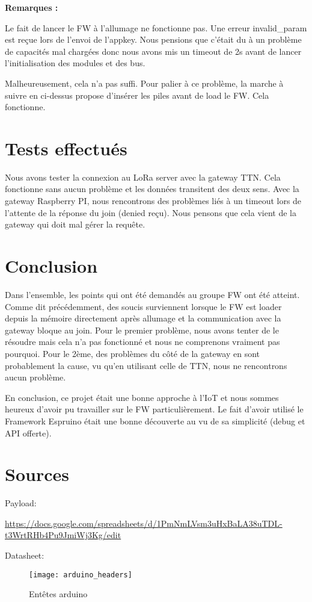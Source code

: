 \textbf{Remarques :}

Le fait de lancer le FW à l'allumage ne fonctionne pas. Une erreur invalid\_param est reçue lors de l'envoi de l'appkey. Nous pensions que c'était du à un problème de capacités mal chargées donc nous avons mis un timeout de 2s avant de lancer l'initialisation des modules et des bus.

Malheureusement, cela n'a pas suffi. Pour palier à ce problème, la marche à suivre en ci-dessus propose d'insérer les piles avant de load le FW. Cela fonctionne.

\section{Tests effectués}

Nous avons tester la connexion au LoRa server avec la gateway TTN. Cela fonctionne sans aucun problème et les données transitent des deux sens.
Avec la gateway Raspberry PI, nous rencontrons des problèmes liés à un timeout lors de l'attente de la réponse du join (denied reçu). Nous pensons que cela vient de la gateway qui doit mal gérer la requête.

\section{Conclusion}

Dans l'ensemble, les points qui ont été demandés au groupe FW ont été atteint. Comme dit précédemment, des soucis surviennent lorsque le FW est loader depuis la mémoire directement après allumage et la communication avec la gateway bloque au join. Pour le premier problème, nous avons tenter de le résoudre mais cela n'a pas fonctionné et nous ne comprenons vraiment pas pourquoi.
Pour le 2ème, des problèmes du côté de la gateway en sont probablement la cause, vu qu'en utilisant celle de TTN, nous ne rencontrons aucun problème.

En conclusion, ce projet était une bonne approche à l'IoT et nous sommes heureux d'avoir pu travailler sur le FW particulièrement. Le fait d'avoir utilisé le Framework Espruino était une bonne découverte au vu de sa simplicité (debug et API offerte).

\section{Sources}

Payload: 

\url{https://docs.google.com/spreadsheets/d/1PmNmLVsm3uHxBaLA38uTDL-t3WrtRHb4Pu9JmiWj3Kg/edit}
\vspace{3mm}

Datasheet: 

\begin{figure}[h!]
\texttt{[image: arduino\_headers]}
\caption{Entêtes arduino}
\end{figure}

